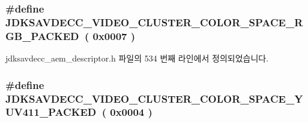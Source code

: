 \subsubsection[{\texorpdfstring{J\+D\+K\+S\+A\+V\+D\+E\+C\+C\+\_\+\+V\+I\+D\+E\+O\+\_\+\+C\+L\+U\+S\+T\+E\+R\+\_\+\+C\+O\+L\+O\+R\+\_\+\+S\+P\+A\+C\+E\+\_\+\+R\+G\+B\+\_\+\+P\+A\+C\+K\+ED}{JDKSAVDECC_VIDEO_CLUSTER_COLOR_SPACE_RGB_PACKED}}]{\setlength{\rightskip}{0pt plus 5cm}\#define J\+D\+K\+S\+A\+V\+D\+E\+C\+C\+\_\+\+V\+I\+D\+E\+O\+\_\+\+C\+L\+U\+S\+T\+E\+R\+\_\+\+C\+O\+L\+O\+R\+\_\+\+S\+P\+A\+C\+E\+\_\+\+R\+G\+B\+\_\+\+P\+A\+C\+K\+ED~( 0x0007 )}\hypertarget{group__video__cluster__color__space_ga7db23794f595b8f0491337d8866fa6d2}{}\label{group__video__cluster__color__space_ga7db23794f595b8f0491337d8866fa6d2}


jdksavdecc\+\_\+aem\+\_\+descriptor.\+h 파일의 534 번째 라인에서 정의되었습니다.

\subsubsection[{\texorpdfstring{J\+D\+K\+S\+A\+V\+D\+E\+C\+C\+\_\+\+V\+I\+D\+E\+O\+\_\+\+C\+L\+U\+S\+T\+E\+R\+\_\+\+C\+O\+L\+O\+R\+\_\+\+S\+P\+A\+C\+E\+\_\+\+Y\+U\+V411\+\_\+\+P\+A\+C\+K\+ED}{JDKSAVDECC_VIDEO_CLUSTER_COLOR_SPACE_YUV411_PACKED}}]{\setlength{\rightskip}{0pt plus 5cm}\#define J\+D\+K\+S\+A\+V\+D\+E\+C\+C\+\_\+\+V\+I\+D\+E\+O\+\_\+\+C\+L\+U\+S\+T\+E\+R\+\_\+\+C\+O\+L\+O\+R\+\_\+\+S\+P\+A\+C\+E\+\_\+\+Y\+U\+V411\+\_\+\+P\+A\+C\+K\+ED~( 0x0004 )}\hypertarget{group__video__cluster__color__space_ga5baa7ae9603f7cd3352ea26b7007f7e5}{}\label{group__video__cluster__color__space_ga5baa7ae9603f7cd3352ea26b7007f7e5}


